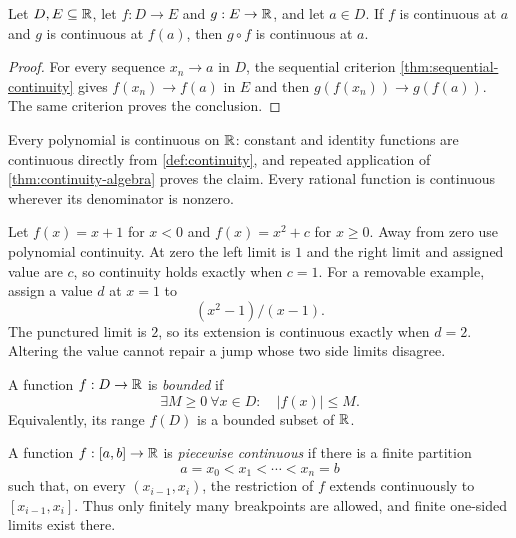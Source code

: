 \begin{proposition}
\label{prop:continuous-composition-real}
Let $D,E\subseteq\mathbb{R}$, let $f:D\to E$ and $g:E\to\mathbb{R}$, and let $a\in D$.
If $f$ is continuous at $a$ and $g$ is continuous at $f(a)$, then
$g\circ f$ is continuous at $a$.
\end{proposition}
\begin{proof}
For every sequence $x_n\to a$ in $D$, the sequential criterion
\cref{thm:sequential-continuity} gives $f(x_n)\to f(a)$ in $E$ and then
$g(f(x_n))\to g(f(a))$. The same criterion proves the conclusion.
\end{proof}

\begin{example}
Every polynomial is continuous on $\mathbb{R}$: constant and identity functions are continuous directly from \cref{def:continuity}, and repeated application of \cref{thm:continuity-algebra} proves the claim. Every rational function is continuous wherever its denominator is nonzero.
\end{example}

\begin{example}
Let $f(x)=x+1$ for $x<0$ and $f(x)=x^2+c$ for $x\geq0$.
Away from zero use polynomial continuity. At zero the left limit is
$1$ and the right limit and assigned value are $c$, so continuity holds
exactly when $c=1$. For a removable example, assign a value $d$ at
$x=1$ to
\[
(x^2-1)/(x-1).
\]
 The punctured limit is $2$, so its
extension is continuous exactly when $d=2$. Altering the value cannot
repair a jump whose two side limits disagree.
\end{example}

\begin{definition}
\label{def:bounded-function}
A function $f:D\to\mathbb{R}$ is \emph{bounded} if
\[
\exists M\geq0\ \forall x\in D:\quad |f(x)|\leq M.
\]
Equivalently, its range $f(D)$ is a bounded subset of $\mathbb{R}$.
\end{definition}

\begin{definition}
\label{def:piecewise-continuous}
A function $f:[a,b]\to\mathbb{R}$ is \emph{piecewise continuous} if there is a
finite partition
\[
a=x_0<x_1<\cdots<x_n=b
\]
such that, on every $(x_{i-1},x_i)$, the restriction of $f$ extends
continuously to $[x_{i-1},x_i]$. Thus only finitely many breakpoints are
allowed, and finite one-sided limits exist there.
\end{definition}

